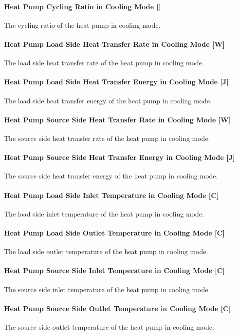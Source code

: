 \paragraph{Heat Pump Cycling Ratio in Cooling Mode {[}{]}} The cycling ratio of
the heat pump in cooling mode.
\paragraph{Heat Pump Load Side Heat Transfer Rate in Cooling Mode {[}W{]}} The
load side heat transfer rate of the heat pump in cooling mode.
\paragraph{Heat Pump Load Side Heat Transfer Energy in Cooling Mode {[}J{]}} The
load side heat transfer energy of the heat pump in cooling mode.
\paragraph{Heat Pump Source Side Heat Transfer Rate in Cooling Mode {[}W{]}} The
source side heat transfer rate of the heat pump in cooling mode.
\paragraph{Heat Pump Source Side Heat Transfer Energy in Cooling Mode {[}J{]}}
The source side heat transfer energy of the heat pump in cooling mode.
\paragraph{Heat Pump Load Side Inlet Temperature in Cooling Mode {[}C{]}} The
load side inlet temperature of the heat pump in cooling mode.
\paragraph{Heat Pump Load Side Outlet Temperature in Cooling Mode {[}C{]}} The
load side outlet temperature of the heat pump in cooling mode.
\paragraph{Heat Pump Source Side Inlet Temperature in Cooling Mode {[}C{]}} The
source side inlet temperature of the heat pump in cooling mode.
\paragraph{Heat Pump Source Side Outlet Temperature in Cooling Mode {[}C{]}} The
source side outlet temperature of the heat pump in cooling mode.
